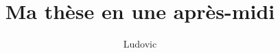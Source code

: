 \documentclass[10pt,a4paper,twoside,onecolumn]{book}
\title{Ma thèse en une après-midi}
\author{Ludovic}
\begin{document}
\maketitle
\dominitoc%
\tableofcontents

\frontmatter %

\mainmatter %

\backmatter %
\listoffigures


\end{document}
